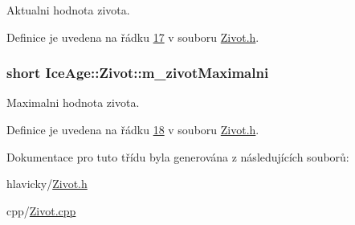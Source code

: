 Aktualni hodnota zivota. 



Definice je uvedena na řádku \hyperlink{Zivot_8h_source_l00017}{17} v souboru \hyperlink{Zivot_8h_source}{Zivot.\+h}.

\subsubsection[{\texorpdfstring{m\+\_\+zivot\+Maximalni}{m_zivotMaximalni}}]{\setlength{\rightskip}{0pt plus 5cm}short Ice\+Age\+::\+Zivot\+::m\+\_\+zivot\+Maximalni\hspace{0.3cm}{\ttfamily [protected]}}\hypertarget{classIceAge_1_1Zivot_a256134d066a2b08095fc5a5fe50ac557}{}\label{classIceAge_1_1Zivot_a256134d066a2b08095fc5a5fe50ac557}


Maximalni hodnota zivota. 



Definice je uvedena na řádku \hyperlink{Zivot_8h_source_l00018}{18} v souboru \hyperlink{Zivot_8h_source}{Zivot.\+h}.



Dokumentace pro tuto třídu byla generována z následujících souborů\+:\begin{DoxyCompactItemize}
\item 
hlavicky/\hyperlink{Zivot_8h}{Zivot.\+h}\item 
cpp/\hyperlink{Zivot_8cpp}{Zivot.\+cpp}\end{DoxyCompactItemize}
